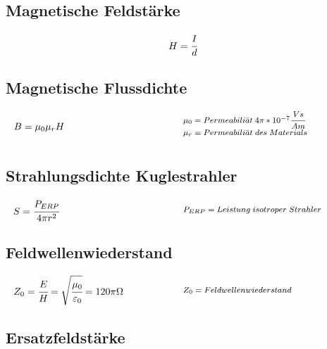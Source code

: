 \documentclass[12pt,a5paper,ngerman,titlepage]{article}
\begin{document}
\subsection{Magnetische Feldstärke}
$$H=\cfrac{I}{d}$$

\subsection{Magnetische Flussdichte}
\[
\begin{minipage}{.5\linewidth}
	
  $B= \mu_{0} \mu_{r} H$

\end{minipage}%
\begin{minipage}{.5\linewidth}
  \fontsize{8pt}{9pt}\selectfont
  $\mu_{0} = Permeabili\ddot{a}t \; 4\pi *10^{-7}\cfrac{Vs}{Am}$ \\
  $\mu_{r} = Permeabili\ddot{a}t \; des \; Materials $ \\


\end{minipage}
\]

\subsection{Strahlungsdichte Kuglestrahler}
\[
\begin{minipage}{.5\linewidth}
	
  $S=\cfrac{P_{ERP}}{4\pi r^2}$

\end{minipage}%
\begin{minipage}{.5\linewidth}
  \fontsize{8pt}{9pt}\selectfont
  $P_{ERP} = Leistung \; isotroper \; Strahler$
\end{minipage}
\]

\subsection{Feldwellenwiederstand}
\[
\begin{minipage}{.5\linewidth}
	
  $Z_{0}=\cfrac{E}{H}=\sqrt{\cfrac{\mu_{0}}{\varepsilon_{0}}}=120\pi \Omega$

\end{minipage}%
\begin{minipage}{.5\linewidth}
  \fontsize{8pt}{9pt}\selectfont
  $Z_{0} = Feldwellenwiederstand$
\end{minipage}
\]

\subsection{Ersatzfeldstärke}
\end{document}
